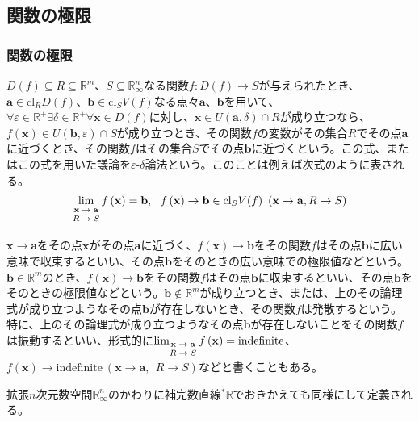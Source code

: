 \documentclass[dvipdfmx]{jsarticle}
\begin{document}
\subsection{関数の極限}%
\subsubsection{関数の極限}%
\begin{dfn}
$D(f) \subseteq R \subseteq \mathbb{R}^{m}$、$S \subseteq \mathbb{R}_{\infty}^{n}$なる関数$f:D(f) \rightarrow S$が与えられたとき、$\mathbf{a} \in \mathrm{cl}_{R}{D(f)}$、$\mathbf{b} \in \mathrm{cl}_{S}{V(f)}$なる点々$\mathbf{a}$、$\mathbf{b}$を用いて、$\forall\varepsilon \in \mathbb{R}^{+}\exists\delta \in \mathbb{R}^{+}\forall\mathbf{x} \in D(f)$に対し、$\mathbf{x} \in U\left( \mathbf{a},\delta \right) \cap R$が成り立つなら、$f\left( \mathbf{x} \right) \in U\left( \mathbf{b},\varepsilon \right) \cap S$が成り立つとき、その関数$f$の変数がその集合$R$でその点$\mathbf{a}$に近づくとき、その関数$f$はその集合$S$でその点$\mathbf{b}$に近づくという。この式、またはこの式を用いた議論を$\varepsilon$-$\delta$論法という。このことは例えば次式のように表される。
\begin{align*}
\lim_{\scriptsize \begin{matrix} \mathbf{x} \rightarrow \mathbf{a} \\ R \rightarrow S \\\end{matrix}}{f\left( \mathbf{x} \right)} = \mathbf{b},\ \ f\left( \mathbf{x} \right) \rightarrow \mathbf{b} \in \mathrm{cl}_{S}{V(f)}\ \left( \mathbf{x} \rightarrow \mathbf{a},R \rightarrow S \right)
\end{align*}\par
$\mathbf{x} \rightarrow \mathbf{a}$をその点$\mathbf{x}$がその点$\mathbf{a}$に近づく、$f\left( \mathbf{x} \right) \rightarrow \mathbf{b}$をその関数$f$はその点$\mathbf{b}$に広い意味で収束するといい、その点$\mathbf{b}$をそのときの広い意味での極限値などという。$\mathbf{b} \in \mathbb{R}^{m}$のとき、$f\left( \mathbf{x} \right) \rightarrow \mathbf{b}$をその関数$f$はその点$\mathbf{b}$に収束するといい、その点$\mathbf{b}$をそのときの極限値などという。$\mathbf{b} \notin \mathbb{R}^{m}$が成り立つとき、または、上のその論理式が成り立つようなその点$\mathbf{b}$が存在しないとき、その関数$f$は発散するという。特に、上のその論理式が成り立つようなその点$\mathbf{b}$が存在しないことをその関数$f$は振動するといい、形式的に$\lim_{\scriptsize \begin{matrix} \mathbf{x} \rightarrow \mathbf{a} \\ R \rightarrow S \\\end{matrix}}{f\left( \mathbf{x} \right)} = \mathrm{indefinite}$、$f\left( \mathbf{x} \right) \rightarrow \mathrm{indefinite}\ \left( \mathbf{x} \rightarrow \mathbf{a,\ \ }R \rightarrow S \right)$などと書くこともある。\par
拡張$n$次元数空間$\mathbb{R}_{\infty}^{n}$のかわりに補完数直線${}^{*}\mathbb{R}$でおきかえても同様にして定義される。
\end{dfn}
\end{document}
